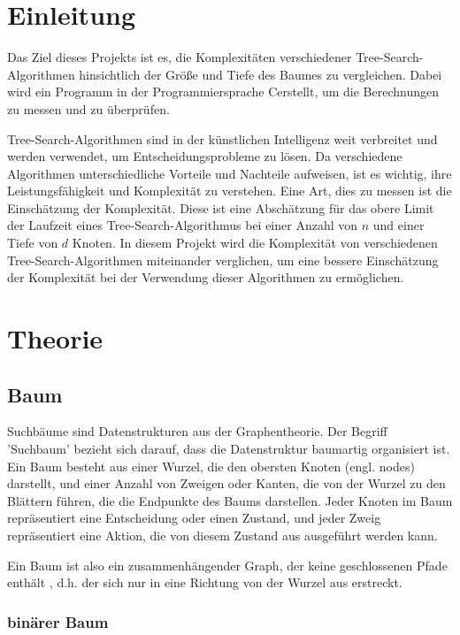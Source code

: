 \documentclass[a4paper,11pt]{article}
\newcommand{\CC}{C\nolinebreak\hspace{-.05em}\raisebox{.4ex}{\tiny\bf +}\nolinebreak\hspace{-.10em}\raisebox{.4ex}{\tiny\bf +}\hspace{.1em}}
\begin{document}
\section{Einleitung}
Das Ziel dieses Projekts ist es, die Komplexitäten verschiedener Tree-Search-Algorithmen hinsichtlich der Größe und Tiefe des Baumes zu vergleichen. Dabei wird ein Programm in der Programmiersprache \CC erstellt, um die Berechnungen zu messen und zu überprüfen. 

Tree-Search-Algorithmen sind in der künstlichen Intelligenz weit verbreitet und werden verwendet, um Entscheidungsprobleme zu lösen. Da verschiedene Algorithmen unterschiedliche Vorteile und Nachteile aufweisen, ist es wichtig, ihre Leistungsfähigkeit und Komplexität zu verstehen. Eine Art, dies zu messen ist die Einschätzung der Komplexität. Diese ist eine Abschätzung für das obere Limit der Laufzeit eines Tree-Search-Algorithmus bei einer Anzahl von $n$ und einer Tiefe von $d$ Knoten. In diesem Projekt wird die Komplexität von verschiedenen Tree-Search-Algorithmen miteinander verglichen, um eine bessere Einschätzung der Komplexität bei der Verwendung dieser Algorithmen zu ermöglichen.


\section{Theorie}
\subsection{Baum}
Suchbäume sind Datenstrukturen aus der Graphentheorie. Der Begriff 'Suchbaum' bezieht sich darauf, dass die Datenstruktur baumartig organisiert ist. Ein Baum besteht aus einer Wurzel, die den obersten Knoten (engl. nodes) darstellt, und einer Anzahl von Zweigen oder Kanten, die von der Wurzel zu den Blättern führen, die die Endpunkte des Baums darstellen. Jeder Knoten im Baum repräsentiert eine Entscheidung oder einen Zustand, und jeder Zweig repräsentiert eine Aktion, die von diesem Zustand aus ausgeführt werden kann.


Ein Baum ist also ein zusammenhängender Graph, der keine geschlossenen Pfade enthält \cite{graphs}, d.h. der sich nur in eine Richtung von der Wurzel aus erstreckt.

\subsubsection{binärer Baum}
\end{document}
